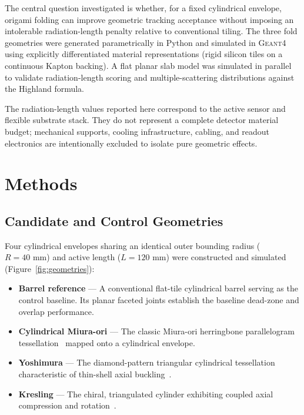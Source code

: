 \documentclass[a4paper,11pt]{article}
\begin{document}
The central question investigated is whether, for a fixed cylindrical envelope, origami folding can improve geometric tracking acceptance without imposing an intolerable radiation-length penalty relative to conventional tiling. The three fold geometries were generated parametrically in Python and simulated in \textsc{Geant4} using explicitly differentiated material representations (rigid silicon tiles on a continuous Kapton backing). A flat planar slab model was simulated in parallel to validate radiation-length scoring and multiple-scattering distributions against the Highland formula.

The radiation-length values reported here correspond to the active sensor and flexible substrate stack. They do not represent a complete detector material budget; mechanical supports, cooling infrastructure, cabling, and readout electronics are intentionally excluded to isolate pure geometric effects.

\FloatBarrier
\section{Methods}
\label{sec:methods}

\subsection{Candidate and Control Geometries}
\label{sec:geometries}

Four cylindrical envelopes sharing an identical outer bounding radius ($R = 40\text{ mm}$) and active length ($L = 120\text{ mm}$) were constructed and simulated (Figure~\ref{fig:geometries}):
\begin{itemize}
    \item \textbf{Barrel reference} --- A conventional flat-tile cylindrical barrel serving as the control baseline. Its planar faceted joints establish the baseline dead-zone and overlap performance.
    \item \textbf{Cylindrical Miura-ori} --- The classic Miura-ori herringbone parallelogram tessellation~\cite{Miura1985} mapped onto a cylindrical envelope.
    \item \textbf{Yoshimura} --- The diamond-pattern triangular cylindrical tessellation characteristic of thin-shell axial buckling~\cite{Yoshimura1955}.
    \item \textbf{Kresling} --- The chiral, triangulated cylinder exhibiting coupled axial compression and rotation~\cite{Kresling2008}.
\end{itemize}
\end{document}
